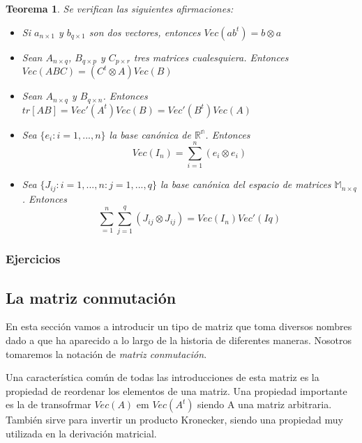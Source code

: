 \documentclass{article}
\theoremstyle{theorem-style}  %
\newtheorem{theorem}{Teorema}[section]  %
\theoremstyle{definition}
\theoremstyle{example-style}
\begin{document}
	\begin{theorem}
		\textit{Se verifican las siguientes afirmaciones:}
		
		\begin{itemize}
			\item \textit{Si $a_{n \times 1}$ y $b_{q \times 1}$ son dos vectores, entonces $Vec(a b^t )=b \otimes a$}
			
			\item \textit{Sean $A_{n \times q}$, $B_{q \times p}$ y $C_{p \times r }$ tres matrices cualesquiera. Entonces $Vec(ABC) = (C^t \otimes A)Vec(B)$}
			
			\item \textit{Sean $A_{n \times q}$ y $B_{q \times n}$. Entonces $tr[AB] = Vec'(A^t)Vec(B) = Vec'(B^t)Vec(A)$}
			
			\item \textit{Sea $\{e_i: i = 1, ..., n\}$ la base canónica de  $\mathbb{R^n}$. Entonces $$Vec(I_n) = \sum_{i=1}^{n}(e_i \otimes e_i)$$}
			
			\item \textit{Sea $\{J_{ij}: i = 1, ..., n: j = 1, ..., q\}$ la base canónica del espacio de matrices $\mathbb{M}_{n \times q}$. Entonces $$\sum_{=1}^{n}  \sum_{j=1}^{q} (J_{ij} \otimes J_{ij}) = Vec(I_n) Vec'(Iq)$$ }
			
		\end{itemize}
	\end{theorem}

\subsubsection{Ejercicios}

\subsection{La matriz conmutación}

En esta sección vamos a introducir un tipo de matriz que toma diversos nombres dado a  que ha aparecido a lo largo de la historia de diferentes maneras. Nosotros tomaremos la notación de \textit{matriz conmutación}. 

Una característica común de todas las introducciones de esta matriz es la propiedad de reordenar los 
elementos de una matriz. Una propiedad importante es la de transofrmar $Vec(A)$ em $Vec(A^t)$ siendo A una matriz arbitraria. También sirve para invertir un producto Kronecker, siendo una propiedad muy utilizada en la derivación matricial.
\end{document}
